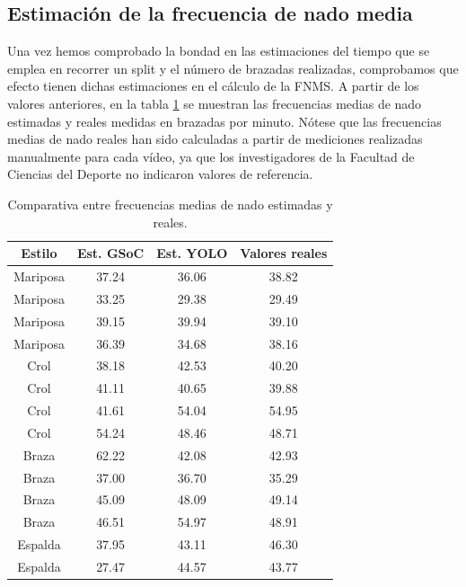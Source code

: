 \subsection{Estimación de la frecuencia de nado media}

Una vez hemos comprobado la bondad en las estimaciones del tiempo que se emplea en recorrer un split y el número de brazadas realizadas, comprobamos que efecto tienen dichas estimaciones en el cálculo de la FNMS. A partir de los valores anteriores, en la tabla \ref{tab:frecuenciasmedianadoest} se muestran las frecuencias medias de nado estimadas y reales medidas en brazadas por minuto. Nótese que las frecuencias medias de nado reales han sido calculadas a partir de mediciones realizadas manualmente para cada vídeo, ya que los investigadores de la Facultad de Ciencias del Deporte no indicaron valores de referencia.

\begin{table}[]
    \centering
    \small
    \begin{tabular}{|c|c|c|c|} \hline
         Estilo & Est. GSoC & Est. YOLO & Valores reales  \\ \hline
         Mariposa & 37.24 & 36.06 & 38.82  \\   
         Mariposa & 33.25 & 29.38 & 29.49 \\
         Mariposa & 39.15 & 39.94 & 39.10 \\
         Mariposa & 36.39 & 34.68 & 38.16 \\
         Crol & 38.18 & 42.53 & 40.20  \\   
         Crol & 41.11 & 40.65 & 39.88 \\    
         Crol & 41.61 & 54.04 & 54.95 \\    
         Crol & 54.24 & 48.46 & 48.71 \\    
         Braza & 62.22 & 42.08 & 42.93 \\   
         Braza & 37.00 & 36.70 & 35.29 \\   
         Braza & 45.09 & 48.09 & 49.14  \\  
         Braza & 46.51 & 54.97 & 48.91  \\  
         Espalda & 37.95 & 43.11 & 46.30 \\ 
         Espalda & 27.47 & 44.57 & 43.77 \\ \hline 
    \end{tabular}
    \caption{Comparativa entre frecuencias medias de nado estimadas y reales.}
    \label{tab:frecuenciasmedianadoest}
\end{table}

